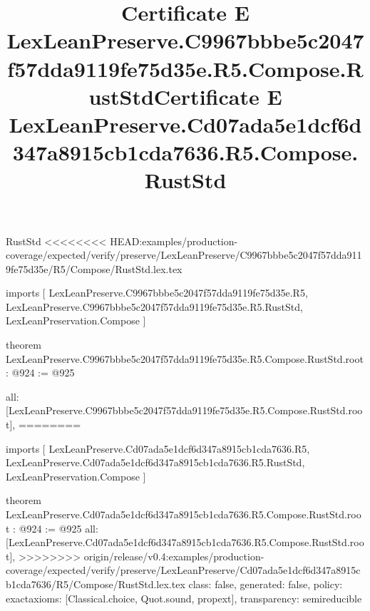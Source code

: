 \begin{lexlean}{RustStd}
<<<<<<<< HEAD:examples/production-coverage/expected/verify/preserve/LexLeanPreserve/C9967bbbe5c2047f57dda9119fe75d35e/R5/Compose/RustStd.lex.tex
\title{Certificate E LexLeanPreserve.C9967bbbe5c2047f57dda9119fe75d35e.R5.Compose.RustStd}
\begin{coremodule}
imports [
  LexLeanPreserve.C9967bbbe5c2047f57dda9119fe75d35e.R5,
  LexLeanPreserve.C9967bbbe5c2047f57dda9119fe75d35e.R5.RustStd,
  LexLeanPreservation.Compose
]

theorem LexLeanPreserve.C9967bbbe5c2047f57dda9119fe75d35e.R5.Compose.RustStd.root : @924 := @925 {
  all: [LexLeanPreserve.C9967bbbe5c2047f57dda9119fe75d35e.R5.Compose.RustStd.root],
========
\title{Certificate E LexLeanPreserve.Cd07ada5e1dcf6d347a8915cb1cda7636.R5.Compose.RustStd}
\begin{coremodule}
imports [
  LexLeanPreserve.Cd07ada5e1dcf6d347a8915cb1cda7636.R5,
  LexLeanPreserve.Cd07ada5e1dcf6d347a8915cb1cda7636.R5.RustStd,
  LexLeanPreservation.Compose
]

theorem LexLeanPreserve.Cd07ada5e1dcf6d347a8915cb1cda7636.R5.Compose.RustStd.root : @924 := @925 {
  all: [LexLeanPreserve.Cd07ada5e1dcf6d347a8915cb1cda7636.R5.Compose.RustStd.root],
>>>>>>>> origin/release/v0.4:examples/production-coverage/expected/verify/preserve/LexLeanPreserve/Cd07ada5e1dcf6d347a8915cb1cda7636/R5/Compose/RustStd.lex.tex
  class: false,
  generated: false,
  policy: exact{axioms: [Classical.choice, Quot.sound, propext]},
  transparency: semireducible
}


\end{coremodule}}
\end{coremodule}
\end{lexlean}
